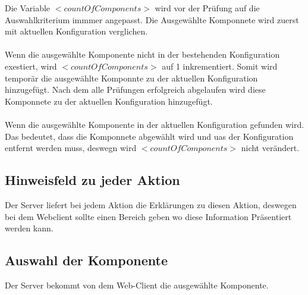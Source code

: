 \documentclass{article}
\begin{document}
\noindent Die Variable $<countOfComponents>$ wird vor der Prüfung auf die
Auswahlkriterium immmer angepasst. Die Ausgew\"ahlte Komponnete wird zuerst mit aktuellen
Konfiguration verglichen. \\\\
Wenn die ausgew\"ahlte Komponente nicht in der
bestehenden Konfiguration exestiert, wird $<countOfComponents>$ auf 1
inkrementiert. Somit wird tempor\"ar die ausgewählte Komponnte zu der aktuellen
Konfiguration hinzugefügt. Nach dem alle Pr\"ufungen erfolgreich abgelaufen wird
diese Komponnete zu der aktuellen Konfiguration hinzugefügt.\\\\
Wenn die ausgew\"ahlte Komponente in der aktuellen Konfiguration gefunden wird.
Das bedeutet, dass die Komponnete abgew\"ahlt wird und uas der Konfiguration
entfernt werden muss, deswegn wird $<countOfComponents>$ nicht ver\"andert.

\subsection{Hinweisfeld zu jeder Aktion}
Der Server liefert bei jedem Aktion die Erklärungen zu diesen Aktion, deswegen
bei dem Webclient sollte einen Bereich geben wo diese Information Präsentiert
werden kann.

\subsection{Auswahl der Komponente}

Der Server bekommt von dem Web-Client die ausgew\"ahlte Komponente.
\end{document}
